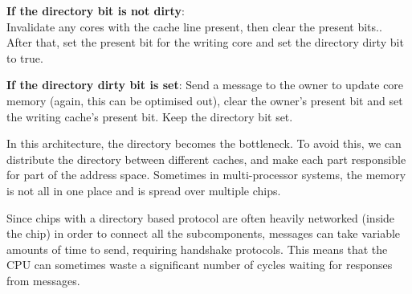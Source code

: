 \begin{description}
\begin{itemize}
      \begin{description}
        \item \textbf{If the directory bit is not dirty}:\\
          Invalidate any cores with the cache line present, then clear the
          present bits.. After that, set the present bit for the writing core
          and set the directory dirty bit to true.
        \item \textbf{If the directory dirty bit is set}:
          Send a message to the owner to update core memory (again, this can
          be optimised out), clear the owner's present bit and set the
          writing cache's present bit. Keep the directory bit set.
      \end{description}
    \end{itemize}
\end{description}

In this architecture, the directory becomes the bottleneck. To avoid this, we
can distribute the directory between different caches, and make each part
responsible for part of the address space. Sometimes in multi-processor systems,
the memory is not all in one place and is spread over multiple chips.

Since chips with a directory based protocol are often heavily networked (inside
the chip) in order to connect all the subcomponents, messages can take variable
amounts of time to send, requiring handshake protocols. This means that the CPU
can sometimes waste a significant number of cycles waiting for responses from
messages.
